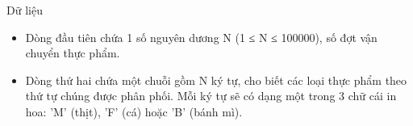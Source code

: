Dữ liệu
\begin{itemize}
	\item     Dòng đầu tiên chứa 1 số nguyên dương N (1 ≤ N ≤ 100000), số đợt vận chuyển thực phẩm.   
	\item     Dòng thứ hai chứa một chuỗi gồm N ký tự, cho biết các loại thực phẩm theo thứ tự chúng được phân phối. Mỗi ký tự sẽ có dạng một trong 3 chữ cái in hoa: 'M' (thịt), 'F' (cá) hoặc 'B' (bánh mì).   
\end{itemize}
